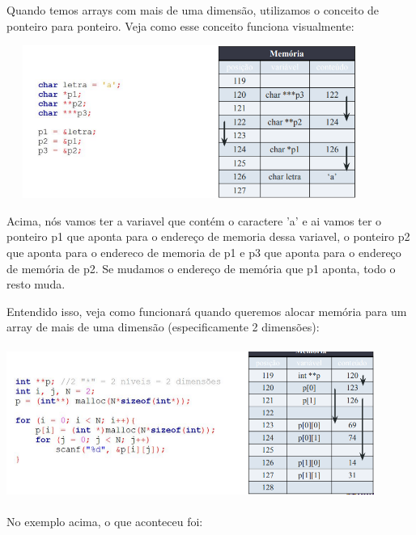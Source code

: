 \documentclass{report}
\begin{document}
	Quando temos arrays com mais de uma dimensão, utilizamos o conceito de ponteiro para ponteiro. Veja como esse conceito funciona visualmente:
	
	\begin{center}
		
		\includegraphics[width=12cm,height=5cm,keepaspectratio=false]{imagens/pointpoint.png}
		
	\end{center}
	
	
	Acima, nós vamos ter a variavel que contém o caractere 'a' e ai vamos ter o ponteiro p1 que aponta para o endereço de memoria dessa variavel, o ponteiro p2 que aponta para o endereco de memoria de p1 e p3 que aponta para o endereço de memória de p2. Se mudamos o endereço de memória que p1 aponta, todo o resto muda.
	
	Entendido isso, veja como funcionará quando queremos alocar memória para um array de mais de uma dimensão (especificamente 2 dimensões):
	
	
	\begin{center}
		
		\includegraphics[width=12cm,height=5cm,keepaspectratio=false]{imagens/alocarray.png}
		
	\end{center}
	
	No exemplo acima, o que aconteceu foi:
	
\end{document}
